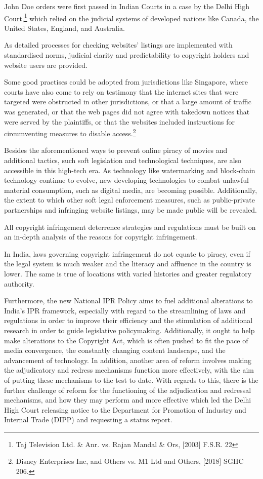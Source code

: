 \begin{multicols}{2}
\noi
John Doe orders were first passed in Indian Courts in a case by the Delhi High Court,\footnote{Taj Television Ltd. \& Anr. vs. Rajan Mandal \& Ors, [2003] F.S.R. 22} which relied on the judicial systems of developed nations like Canada, the United States, England, and Australia.

\noi
As detailed processes for checking websites' listings are implemented with standardised
norms, judicial clarity and predictability to copyright holders and website users are provided.

\noi
Some good practises could be adopted from jurisdictions like Singapore, where courts have
also come to rely on testimony that the internet sites that were targeted were obstructed in
other jurisdictions, or that a large amount of traffic was generated, or that the web pages did
not agree with takedown notices that were served by the plaintiffs, or that the websites
included instructions for circumventing measures to disable access.\footnote{Disney Enterprises Inc, and Others vs. M1 Ltd and Others, [2018] SGHC 206.}

\noi
Besides the aforementioned ways to prevent online piracy of movies and additional tactics,
such soft legislation and technological techniques, are also accessible in this high-tech era. As
technology like watermarking and block-chain technology continue to evolve, new
developing technologies to combat unlawful material consumption, such as digital media, are
becoming possible. Additionally, the extent to which other soft legal enforcement measures,
such as public-private partnerships and infringing website listings, may be made public will
be revealed.


\noi
All copyright infringement deterrence strategies and regulations must be built on an in-depth
analysis of the reasons for copyright infringement.

\noi
In India, laws governing copyright infringement do not equate to piracy, even if the legal
system is much weaker and the literacy and affluence in the country is lower. The same is
true of locations with varied histories and greater regulatory authority.

\noi
Furthermore, the new National IPR Policy aims to fuel additional alterations to India's IPR
framework, especially with regard to the streamlining of laws and regulations in order to
improve their efficiency and the stimulation of additional research in order to guide
legislative policymaking. Additionally, it ought to help make alterations to the Copyright Act,
which is often pushed to fit the pace of media convergence, the constantly changing content
landscape, and the advancement of technology. In addition, another area of reform involves
making the adjudicatory and redress mechanisms function more effectively, with the aim of
putting these mechanisms to the test to date. With regards to this, there is the further
challenge of reform for the functioning of the adjudication and redressal mechanisms, and
how they may perform and more effective which led the Delhi High Court releasing notice to
the Department for Promotion of Industry and Internal Trade (DIPP) and requesting a status
report.


\end{multicols}
